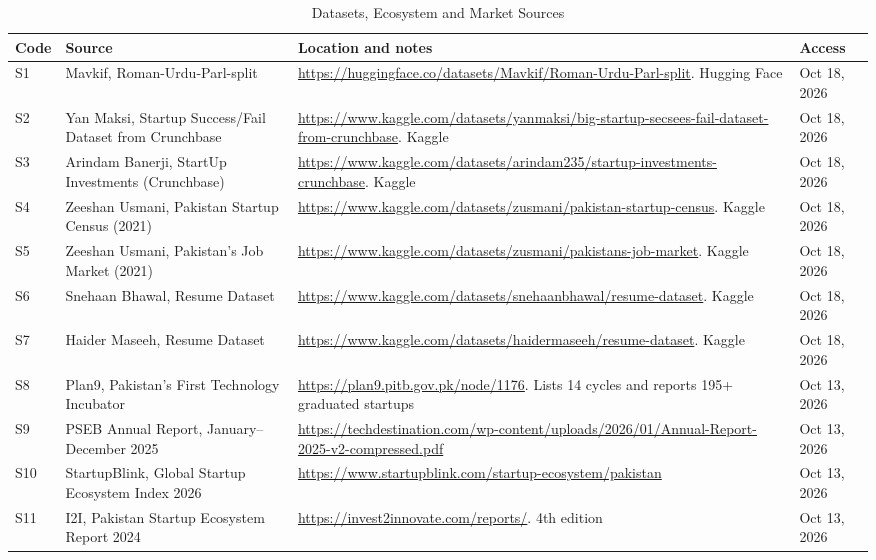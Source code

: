 \documentclass{FastFyp}
\begin{document}
\begin{table}[!ht]
\centering
\caption{Datasets, Ecosystem and Market Sources}
\label{tab:src-all}
\small
\setlength{\tabcolsep}{3pt}
\renewcommand{\arraystretch}{1.25}
\begin{tabular}{|p{}|p{}|p{}|p{}|}

\hline
\textbf{Code} & \textbf{Source} & \textbf{Location and notes} & \textbf{Access} \\ \hline

S1 & Mavkif, Roman-Urdu-Parl-split & \url{https://huggingface.co/datasets/Mavkif/Roman-Urdu-Parl-split}. Hugging Face & Oct 18, 2026 \\ \hline

S2 & Yan Maksi, Startup Success/Fail Dataset from Crunchbase & \url{https://www.kaggle.com/datasets/yanmaksi/big-startup-secsees-fail-dataset-from-crunchbase}. Kaggle & Oct 18, 2026 \\ \hline

S3 & Arindam Banerji, StartUp Investments (Crunchbase) & \url{https://www.kaggle.com/datasets/arindam235/startup-investments-crunchbase}. Kaggle & Oct 18, 2026 \\ \hline

S4 & Zeeshan Usmani, Pakistan Startup Census (2021) & \url{https://www.kaggle.com/datasets/zusmani/pakistan-startup-census}. Kaggle & Oct 18, 2026 \\ \hline

S5 & Zeeshan Usmani, Pakistan's Job Market (2021) & \url{https://www.kaggle.com/datasets/zusmani/pakistans-job-market}. Kaggle & Oct 18, 2026 \\ \hline

S6 & Snehaan Bhawal, Resume Dataset & \url{https://www.kaggle.com/datasets/snehaanbhawal/resume-dataset}. Kaggle & Oct 18, 2026 \\ \hline

S7 & Haider Maseeh, Resume Dataset & \url{https://www.kaggle.com/datasets/haidermaseeh/resume-dataset}. Kaggle & Oct 18, 2026 \\ \hline

S8 & Plan9, Pakistan's First Technology Incubator & \url{https://plan9.pitb.gov.pk/node/1176}. Lists 14 cycles and reports 195+ graduated startups & Oct 13, 2026 \\ \hline

S9 & PSEB Annual Report, January--December 2025 & \url{https://techdestination.com/wp-content/uploads/2026/01/Annual-Report-2025-v2-compressed.pdf} & Oct 13, 2026 \\ \hline

S10 & StartupBlink, Global Startup Ecosystem Index 2026 & \url{https://www.startupblink.com/startup-ecosystem/pakistan} & Oct 13, 2026 \\ \hline

S11 & I2I, Pakistan Startup Ecosystem Report 2024 & \url{https://invest2innovate.com/reports/}. 4th edition & Oct 13, 2026 \\ \hline

\end{tabular}
\end{table}
\end{document}

